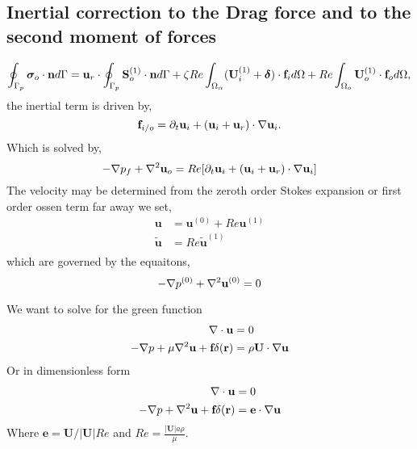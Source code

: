 \subsection{Inertial correction to the Drag force and to the second moment of forces}
\begin{equation}
    \intS[p]{\bm\sigma_{o}\cdot \textbf{n}}
    =
    \textbf{u}_{r}\cdot\intS[p]{ \textbf{S}_{o}^{(1)}\cdot \textbf{n}}
    + \zeta Re \intO{(\textbf{U}_{i}^{(1)} + \bm\delta)\cdot \textbf{f}_{i}}
    + Re\intO[o]{\textbf{U}_{o}^{(1)}\cdot \textbf{f}_{o}},
\end{equation}
the inertial term is driven by,
\begin{equation}
    \textbf{f}_{i/o} =
    \pddt \textbf{u}_{i}
    + (\textbf{u}_{i}+\textbf{u}_r)\cdot \grad \textbf{u}_{i}.
\end{equation}
Which is solved by,
\begin{equation}
    - \grad p_f
    + \grad^2 \textbf{u}_o
    = Re [\pddt \textbf{u}_{i}
    + (\textbf{u}_{i}+\textbf{u}_r)\cdot \grad \textbf{u}_{i}]
\end{equation}
The velocity may be determined from the zeroth order Stokes expansion or first order ossen term far away
we set,
\begin{align}
    \textbf{u} &= \textbf{u}^{(0)} + Re \textbf{u}^{(1)}\\
    \widetilde{\textbf{u}} &=  Re \widetilde{\textbf{u}}^{(1)}\\
\end{align}
which are governed by the equaitons,
\begin{equation}
    - \grad p^{(0)} + \grad^2 \textbf{u}^{(0)} = 0
\end{equation}

We want to solve for the green function
\begin{align}
    \div \textbf{u}&= 0\\
    - \grad p
    + \mu \grad^2 \textbf{u}
    + \textbf{f}\delta(\textbf{r})
    &=
    \rho \textbf{U}\cdot \grad \textbf{u}
\end{align}
Or in dimensionless form
\begin{align}
    \div \textbf{u}&= 0\\
    - \grad p
    +  \grad^2 \textbf{u}
    + \textbf{f}\delta(\textbf{r})
    &=
    \textbf{e}\cdot \grad \textbf{u}
\end{align}
Where $\textbf{e} = \textbf{U}/|\textbf{U}| Re$ and $Re = \frac{|\textbf{U}|a \rho}{\mu}$.

